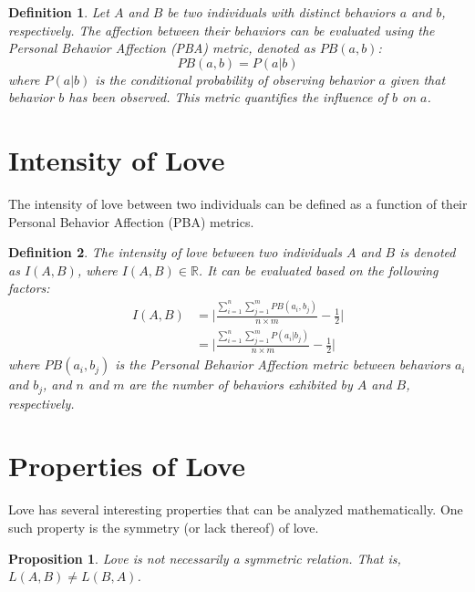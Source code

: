 \documentclass{article}
\newtheorem{definition}{Definition}
\newtheorem{proposition}{Proposition}
\begin{document}
\begin{definition}
    Let $A$ and $B$ be two individuals with distinct behaviors $a$ and $b$, respectively. The affection between their behaviors can be evaluated using the Personal Behavior Affection (PBA) metric, denoted as $PB(a, b)$:
    \[
        PB(a, b) = P(a|b)
    \]
    where $P(a|b)$ is the conditional probability of observing behavior $a$ given that behavior $b$ has been observed. This metric quantifies the influence of $b$ on $a$.
\end{definition}

\section{Intensity of Love}
The intensity of love between two individuals can be defined as a function of their Personal Behavior Affection (PBA) metrics.

\begin{definition}
    The intensity of love between two individuals $A$ and $B$ is denoted as $I(A, B)$, where $I(A, B) \in \mathbb{R}$. It can be evaluated based on the following factors:
    \begin{equation}
        \begin{split}
            I(A, B) &= \lvert \frac{\sum_{i=1}^{n} \sum_{j=1}^{m} PB(a_i, b_j)}{n\times m} - \frac{1}{2} \lvert \\
            &= \lvert \frac{\sum_{i=1}^{n} \sum_{j=1}^{m} P(a_i | b_j)}{n\times m} - \frac{1}{2} \lvert
        \end{split}
    \end{equation}
    where $PB(a_i, b_j)$ is the Personal Behavior Affection metric between behaviors $a_i$ and $b_j$, and $n$ and $m$ are the number of behaviors exhibited by $A$ and $B$, respectively.
\end{definition}

\section{Properties of Love}
Love has several interesting properties that can be analyzed mathematically. One such property is the symmetry (or lack thereof) of love.

\begin{proposition}
    Love is not necessarily a symmetric relation. That is, $L(A, B) \neq L(B, A)$.
\end{proposition}
\end{document}
